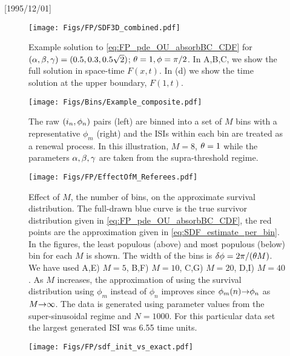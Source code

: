 \NeedsTeXFormat{LaTeX2e}[1995/12/01] \documentclass[10pt]{bmc_article}
\newenvironment{bmcformat}{\begin{raggedright}\baselineskip20pt\sloppy\setboolean{publ}{false}}{\end{raggedright}\baselineskip20pt\sloppy}
\begin{document}
\begin{bmcformat}
\begin{figure}[ht]
\end{figure}      
\begin{figure}[h] 
\begin{center} 
\texttt{[image: Figs/FP/SDF3D\_combined.pdf]}  
\caption{Example solution to \cref{eq:FP_pde_OU_absorbBC_CDF} for 
$({\alpha},{\beta},{\gamma }) = (0.5, 0.3, 0.5\sqrt{2})$; ${\theta}= 1, \phi = \pi / 2$. 
In A,B,C, we show the full solution in space-time $F(x,t)$. In (d) we show 
the time solution at the upper boundary, $F(1,t)$.}  
\label{fig:FP_pde_OU_absorbBC_CDF}  
\end{center} 
\end{figure} 
\begin{figure}[ht] 
\begin{center} 
\texttt{[image: Figs/Bins/Example\_composite.pdf]} 
  \end{center} 
\caption{ The raw $({ i_n}, \phi_n)$ pairs (left) are binned into a set of $M$ bins 
with a representative $\phi_m$ (right) and the ISIs within each bin are treated 
as a renewal process. In this illustration, $M=8$, ${\theta} = 
1$ while the parameters ${{\alpha},{\beta},{\gamma } }$ are taken from the 
supra-threshold regime. } 
\label{fig:binning_visualized}  
\end{figure} 
\begin{figure}[h] 
\begin{center} 
\texttt{[image: Figs/FP/EffectOfM\_Referees.pdf]} 
\caption{Effect of $M$, the number of bins, on the approximate survival 
distribution. The full-drawn blue curve is the true survivor distribution 
given in \cref{eq:FP_pde_OU_absorbBC_CDF}, the red points are the approximation 
given in \cref{eq:SDF_estimate_per_bin}.   
In the figures, the least populous (above) and most populous (below) bin for 
each $M$ is shown. The width of the bins is ${ \delta \phi } = {2\pi}/{({\theta} M)}$. 
We have used A,E) $M=5$, B,F) $M=10$, C,G) $M=20$, 
D,I) $M=40$. As $M$ increases, the approximation of using the survival 
distribution using $\phi_m$ instead of $\phi_n$ improves since $\phi_m(n) {\rightarrow} 
\phi_n$ as $M {\rightarrow} \infty$. The data is generated using parameter 
values from the super-sinusoidal regime and $N=1000$. For this 
particular data set the largest generated ISI was 6.55 time units.} 
\label{fig:effect_of_M} 
\end{center} 
\end{figure} 
\begin{figure}[htp] 
\begin{center} 
\texttt{[image: Figs/FP/sdf\_init\_vs\_exact.pdf]} 

\end{center}
\end{figure}
\end{bmcformat}
\end{document}
